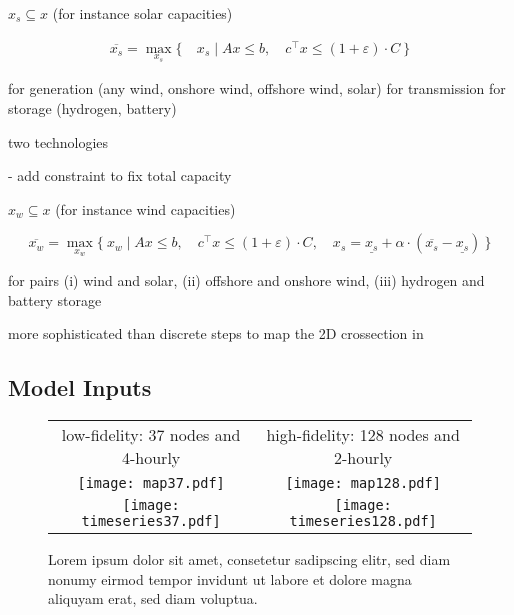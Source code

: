 $x_s\subseteq x$ (for instance solar capacities)

\begin{align}
    \overline{x_s} = \max_{x_s}\{\:&x_s \mid Ax\leq b,\quad c^\top x\leq (1+\varepsilon)\cdot C \:\}
\end{align}

for generation (any wind, onshore wind, offshore wind, solar)
for transmission
for storage (hydrogen, battery)

two technologies

- add constraint to fix total capacity

$x_w\subseteq x$ (for instance wind capacities)

\begin{equation}
    \overline{x_w} = \max_{x_w}\{\:x_w \mid Ax\leq b,\quad c^\top x\leq (1+\varepsilon)\cdot C, \quad x_s = \underline{x_s} + \alpha \cdot (\overline{x_s}-\underline{x_s}) \:\}
\end{equation}

for pairs
(i) wind and solar,
(ii) offshore and onshore wind,
(iii) hydrogen and battery storage

more sophisticated than discrete steps to map the 2D crossection in \cite{pedersen_modeling_2020}


\subsection{Model Inputs}

\begin{SCfigure}
    \begin{tabular}{cc}
        \footnotesize low-fidelity: 37 nodes and 4-hourly & \footnotesize high-fidelity: 128 nodes and 2-hourly \\
        \texttt{[image: map37.pdf]} &
        \texttt{[image: map128.pdf]} \\
        \texttt{[image: timeseries37.pdf]} &
        \texttt{[image: timeseries128.pdf]} \\
    \end{tabular}
    \caption{Lorem ipsum dolor sit amet, consetetur sadipscing elitr, sed diam nonumy eirmod tempor invidunt ut labore et dolore magna aliquyam erat, sed diam voluptua.}
\end{SCfigure}


